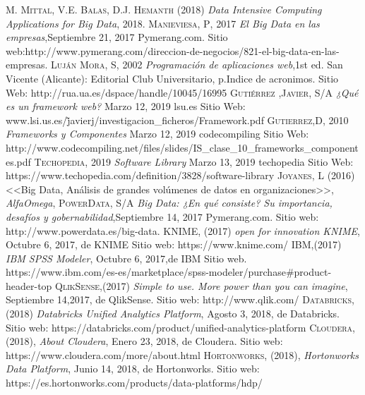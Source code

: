 \begin{thebibliography}{}
	 \textsc{M. Mittal, V.E. Balas, D.J. Hemanth} (2018) \textit{Data Intensive Computing Applications for Big Data}, 2018.
	 \textsc{Manieviesa, P}, 2017
	\textit{El Big Data en las empresas},Septiembre 21, 2017 Pymerang.com. Sitio web:http://www.pymerang.com/direccion-de-negocios/821-el-big-data-en-las-empresas.
	 \textsc{Luján Mora, S}, 2002
	\textit{Programación de aplicaciones web},1st ed. San Vicente (Alicante): Editorial Club Universitario, p.Indice de acronimos. Sitio Web: http://rua.ua.es/dspace/handle/10045/16995
	 \textsc{Gutiérrez ,Javier}, S/A
	\textit{¿Qué es un framework web?} Marzo 12, 2019 lsu.es Sitio Web: www.lsi.us.es/\~javierj/investigacion\_ficheros/Framework.pdf
	 \textsc{Gutierrez,D}, 2010
	\textit{Frameworks y Componentes} Marzo 12, 2019 codecompiling Sitio Web: http://www.codecompiling.net/files/slides/IS\_clase\_10\_frameworks\_componentes.pdf
	 \textsc{Techopedia}, 2019
	\textit{Software Library} Marzo 13, 2019 techopedia Sitio Web: https://www.techopedia.com/definition/3828/software-library
	 \textsc{Joyanes, L} (2016)
	<<Big Data, Análisis de grandes volúmenes de datos en organizaciones>>,
	\textit{AlfaOmega},
	 \textsc{PowerData}, S/A
	\textit{Big Data: ¿En qué consiste? Su importancia, desafíos y gobernabilidad},Septiembre 14, 2017 Pymerang.com. Sitio web: http://www.powerdata.es/big-data.
	 \textsc{KNIME}, (2017)
	\textit{open for innovation KNIME}, Octubre 6, 2017, de KNIME Sitio web: https://www.knime.com/	
	 \textsc{IBM},(2017)
	\textit{IBM SPSS Modeler}, Octubre 6, 2017,de IBM Sitio web. 	
	https://www.ibm.com/es-es/marketplace/spss-modeler/purchase\#product-header-top
	 \textsc{QlikSense},(2017)
	\textit{ Simple to use. More power than you can imagine}, Septiembre 14,2017, de QlikSense. Sitio web: http://www.qlik.com/	
	 \textsc{Databricks}, (2018)
	\textit{Databricks Unified Analytics Platform}, Agosto 3, 2018, de Databricks. Sitio web: https://databricks.com/product/unified-analytics-platform
	 \textsc{Cloudera}, (2018), \textit{About Cloudera}, Enero 23, 2018, de Cloudera. Sitio web: https://www.cloudera.com/more/about.html
	 \textsc{Hortonworks}, (2018), \textit{Hortonworks Data Platform}, Junio 14, 2018, de Hortonworks. Sitio web: https://es.hortonworks.com/products/data-platforms/hdp/

\end{thebibliography}
